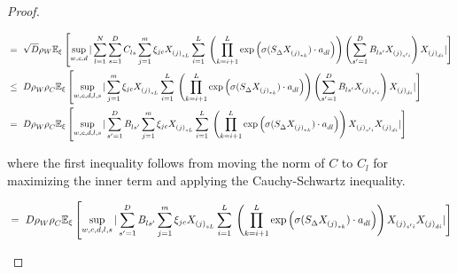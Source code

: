 \begin{proof}
\begin{small}
\begin{equation*}
\begin{aligned}
&=~ \sqrt{D} \rho_W \mathbb{E}_{\xi}\left[\sup_{w,c, d}   | \sum_{l=1}^N \sum_{s=1}^D C_{ls}^{} \sum_{j=1}^m \xi_{jc}  X^{}_{{(j)}_{sL}} \sum_{i=1}^L \right. \left. \left(\prod_{k=i+1}^L \exp\left(\sigma(S^{}_{\Delta} X^{}_{{(j)}_{*k}}) \cdot a^{}_{dl}\right) \right) \left(\sum_{s'=1}^DB_{ls'}^{} X^{}_{{(j)}_{s'i}} \right) X^{}_{{(j)}_{di}} | \right] \\
&\leq~ D \rho^{}_W \rho^{}_C \mathbb{E}_{\xi}\left[\sup_{w,c, d, l, s} | \sum_{j=1}^m \xi_{jc}  X^{}_{{(j)}_{sL}} \sum_{i=1}^L \right.  \left. \left(\prod_{k=i+1}^L \exp\left(\sigma(S^{}_{\Delta} X^{}_{{(j)}_{*k}}) \cdot a^{}_{dl}\right) \right) \left(\sum_{s'=1}^DB_{ls'}^{} X^{}_{{(j)}_{s'i}} \right) X^{}_{{(j)}_{di}} |  \right] \\
&=~ D \rho^{}_W \rho^{}_C \mathbb{E}_{\xi}\left[\sup_{w,c, d, l, s} | \sum_{s'=1}^D B_{ls'}^{} \sum_{j=1}^m \xi_{jc}  X^{}_{{(j)}_{sL}} \sum_{i=1}^L \right.  \left. \left(\prod_{k=i+1}^L \exp\left(\sigma(S^{}_{\Delta} X^{}_{{(j)}_{*k}}) \cdot a^{}_{dl}\right) \right) X^{}_{{(j)}_{s'i}} X^{}_{{(j)}_{di}} |  \right]
\end{aligned}
\end{equation*}
\end{small}
where the first inequality follows from moving the norm of $C$ to $C_{l}$ for maximizing the inner term and applying the Cauchy-Schwartz inequality. 
\begin{small}
\begin{equation*}
\begin{aligned}
&=~ D \rho^{}_W \rho^{}_C \E_{\xi}\left[\sup_{w,c, d, l, s} | \sum_{s'=1}^D B_{ls'}^{} \sum_{j=1}^m \xi_{jc}  X^{}_{{(j)}_{sL}} \sum_{i=1}^L \right.  \left.\left(\prod_{k=i+1}^L \exp\left(\sigma(S^{}_{\Delta} X^{}_{{(j)}_{*k}}) \cdot a^{}_{dl}\right) \right) X^{}_{{(j)}_{s'i}} X^{}_{{(j)}_{di}} |  \right] \\

\end{aligned}
\end{equation*}
\end{small}
\end{proof}
